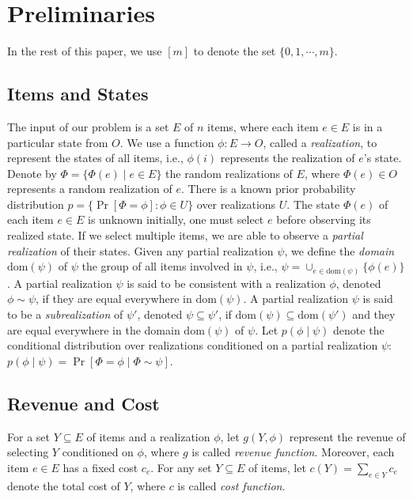 \documentclass[twoside,leqno,twocolumn]{article}
\begin{document}
\section{Preliminaries}
In the rest of this paper, we use  $[m]$ to denote the set $\{0, 1, \cdots, m\}$.

\subsection{Items and States} The input of our problem is a set  $E$ of $n$ items, where each item $e \in E$ is in a particular state from  $O$.  We use a function $\phi: E\rightarrow O$, called a \emph{realization}, to represent the states of all items, i.e., $\phi(i)$ represents the realization of $e$'s state. Denote by $\Phi=\{\Phi(e) \mid e\in E\}$  the  random realizations of $E$, where $\Phi(e) \in O$ represents a random realization of $e$. There is a known prior probability distribution $p=\{\Pr[\Phi=\phi]: \phi\in U\}$ over realizations $U$.  The state $\Phi(e)$ of each item $e \in E$ is  unknown initially, one must select $e$ before observing its realized state. If we select multiple items, we are able to observe a \emph{partial realization} of their states.   Given any partial realization $\psi$, we define the \emph{domain} $\mathrm{dom}(\psi)$ of $\psi$  the group of all items involved in $\psi$, i.e., $\psi = \cup_{e\in  \mathrm{dom}(\psi)} \{\phi(e)\}$. A partial realization $\psi$ is said to be consistent with a realization $\phi$, denoted $\phi \sim \psi$, if they are equal everywhere in $\mathrm{dom}(\psi)$.  A partial realization $\psi$  is said to be a \emph{subrealization} of  $\psi'$, denoted  $\psi \subseteq \psi'$, if $\mathrm{dom}(\psi) \subseteq \mathrm{dom}(\psi')$ and they are equal everywhere in the domain $\mathrm{dom}(\psi)$ of $\psi$. Let $p(\phi\mid \psi)$ denote the conditional distribution over realizations conditioned on  a partial realization $\psi$: $p(\phi\mid \psi) =\Pr[\Phi=\phi\mid \Phi\sim \psi ]$.

\subsection{Revenue and Cost}For a set $Y\subseteq E$ of items and a realization $\phi$, let $g(Y, \phi)$ represent the revenue of selecting $Y$ conditioned on $\phi$, where $g$ is called \emph{revenue function}.  Moreover, each item $e\in E$ has a fixed cost $c_e$. For any set $Y\subseteq E$ of items, let $c(Y) = \sum_{e\in Y} c_e$ denote the total cost of $Y$, where $c$ is called \emph{cost function}.
\end{document}

